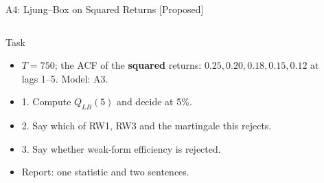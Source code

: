 \begin{frame}{A4: Ljung--Box on Squared Returns [Proposed]}
\propsub
\itemsize{\scriptsize}
\begin{columns}[T]
\begin{column}{\taskw}
\begin{block}{Task}
\begin{itemize}
    \item $T = 750$; the ACF of the \textbf{squared} returns: $0.25, 0.20, 0.18, 0.15, 0.12$ at lags 1--5. Model: A3.
    \item 1. Compute $Q_{LB}(5)$ and decide at 5\%.
    \item 2. Say which of RW1, RW3 and the martingale this rejects.
    \item 3. Say whether weak-form efficiency is rejected.
    \item Report: one statistic and two sentences.
\end{itemize}
\end{block}
\end{column}
\begin{column}{\solw}
\end{column}
\end{columns}
\end{frame}

